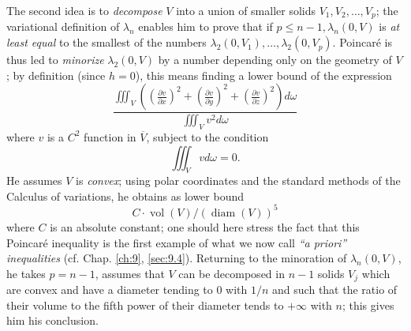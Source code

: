 \documentclass[12pt,a4paper,leqno,twoside]{extbook}
\newcommand{\diam}{\operatorname{diam}}
\newcommand{\vol}{\operatorname{vol}}
\newcommand{\pder}[2]{\frac{\partial #1}{\partial #2}}
\newcommand{\divergence}[1]{\left(\pder{#1}{x}\right)^2 + \left(\pder{#1}{y}\right)^2 + \left(\pder{#1}{z}\right)^2}
\begin{document}
The second idea is to \emph{decompose} \(V\) into a union of smaller solids \(V_1, V_2, \ldots, V_p\); the variational definition of \(\lambda_n\) enables him to prove that if \(p \leq n-1, \lambda_n(0, V)\) is \emph{at least equal} to the smallest of the numbers \(\lambda_2(0, V_1), \ldots, \lambda_2(0, V_p)\). Poincaré is thus led to \emph{minorize} \(\lambda_2(0, V)\) by a number depending only on the geometry of \(V\); by definition (since \(h = 0\)), this means finding a lower bound of the expression
\begin{equation}
    \label{eq:3.26}
    \frac{\iiint_V \left(\divergence{v}\right) d\omega}{\iiint_V v^2 d\omega}
\end{equation}
where \(v\) is a \(C^2\) function in \(\overline{V}\), subject to the condition
\begin{equation}
    \label{eq:3.27}
    \iiint_V v d\omega = 0.
\end{equation}
He assumes \(V\) is \emph{convex}; using polar coordinates and the standard methods of the Calculus of variations, he obtains as lower bound
\begin{equation}
    \label{eq:3.28}
    C \cdot \vol(V)/(\diam(V))^5
\end{equation}
where \(C\) is an absolute constant; one should here stress the fact that this Poincaré inequality is the first example of what we now call \emph{``a priori'' inequalities} (cf. Chap. \ref{ch:9}, \ref{sec:9.4}). Returning to the minoration of \(\lambda_n(0, V)\), he takes \(p = n-1\), assumes that \(V\) can be decomposed in \(n-1\) solids \(V_j\) which are convex and have a diameter tending to 0 with \(1/n\) and such that the ratio of their volume to the fifth power of their diameter tends to \(+\infty\) with \(n\); this gives him his conclusion.
\end{document}
